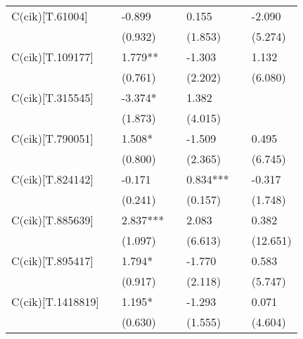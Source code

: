 \begin{table}
\begin{center}
\begin{tabular}{lllllll}
C(cik)[T.61004]   &                 & -0.899          &                 & 0.155           &                 & -2.090           \\
                  &                 & (0.932)         &                 & (1.853)         &                 & (5.274)          \\
C(cik)[T.109177]  &                 & 1.779**         &                 & -1.303          &                 & 1.132            \\
                  &                 & (0.761)         &                 & (2.202)         &                 & (6.080)          \\
C(cik)[T.315545]  &                 & -3.374*         &                 & 1.382           &                 &                  \\
                  &                 & (1.873)         &                 & (4.015)         &                 &                  \\
C(cik)[T.790051]  &                 & 1.508*          &                 & -1.509          &                 & 0.495            \\
                  &                 & (0.800)         &                 & (2.365)         &                 & (6.745)          \\
C(cik)[T.824142]  &                 & -0.171          &                 & 0.834***        &                 & -0.317           \\
                  &                 & (0.241)         &                 & (0.157)         &                 & (1.748)          \\
C(cik)[T.885639]  &                 & 2.837***        &                 & 2.083           &                 & 0.382            \\
                  &                 & (1.097)         &                 & (6.613)         &                 & (12.651)         \\
C(cik)[T.895417]  &                 & 1.794*          &                 & -1.770          &                 & 0.583            \\
                  &                 & (0.917)         &                 & (2.118)         &                 & (5.747)          \\
C(cik)[T.1418819] &                 & 1.195*          &                 & -1.293          &                 & 0.071            \\
                  &                 & (0.630)         &                 & (1.555)         &                 & (4.604)          \\

\end{tabular}
\end{center}
\end{table}
